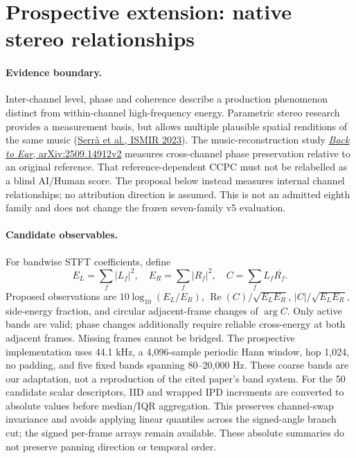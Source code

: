 \section{Prospective extension: native stereo relationships}
\label{sec:stereo-candidate-scope}

\paragraph{Evidence boundary.}
Inter-channel level, phase and coherence describe a production phenomenon
distinct from within-channel high-frequency energy. Parametric stereo research
provides a measurement basis, but allows multiple plausible spatial renditions
of the same music
(\href{https://archives.ismir.net/ismir2023/paper/000035.pdf}{Serr\`a et al., ISMIR 2023}).
The music-reconstruction study
\href{https://arxiv.org/html/2509.14912v2}{\emph{Back to Ear}, arXiv:2509.14912v2}
measures cross-channel phase preservation relative to an original reference.
That reference-dependent CCPC must not be relabelled as a blind AI/Human score.
The proposal below instead measures internal channel relationships; no
attribution direction is assumed. This is not an admitted eighth family and
does not change the frozen seven-family v5 evaluation.

\paragraph{Candidate observables.}
For bandwise STFT coefficients, define
\[
 E_L=\sum_f |L_f|^2,\quad E_R=\sum_f |R_f|^2,\quad
 C=\sum_f L_f\overline{R_f}.
\]
Proposed observations are $10\log_{10}(E_L/E_R)$,
$\operatorname{Re}(C)/\sqrt{E_LE_R}$,
$|C|/\sqrt{E_LE_R}$, side-energy fraction, and circular adjacent-frame
changes of $\arg C$. Only active bands are valid; phase changes additionally
require reliable cross-energy at both adjacent frames. Missing frames cannot
be bridged. The prospective implementation uses 44.1 kHz, a 4,096-sample
periodic Hann window, hop 1,024, no padding, and five fixed bands spanning
80--20,000 Hz. These coarse bands are our adaptation, not a reproduction of
the cited paper's band system.
For the 50 candidate scalar descriptors, IID and wrapped IPD increments are
converted to absolute values before median/IQR aggregation. This preserves
channel-swap invariance and avoids applying linear quantiles across the
signed-angle branch cut; the signed per-frame arrays remain available.
These absolute summaries do not preserve panning direction or temporal order.

